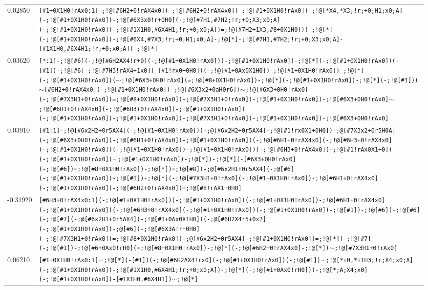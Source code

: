 \begin{longtable}{>{\baselineskip=10pt}p{} >{\baselineskip=10pt}p{}}
0.02850 & \texttt{[\#1+0X1H0!rAx0:1]-;!@[\#6H2+0!rAX4x0](-;!@[\#6H2+0!rAX4x0](-;!@[\#1+0X1H0!rAx0])-;!@[*X4,*X3;!r;+0;H1;x0;A](-;!@[\#1+0X1H0!rAx0])-;!@[\#6X3x0!r+0H0](-;!@[\#7H1,\#7H2;!r;+0;X3;x0;A](-;!@[\#1+0X1H0!rAx0])-;!@[\#1X1H0,\#6X4H1;!r;+0;x0;A])=;!@[\#7H2+1X3,\#8+0X1H0])(-;!@[*](-;!@[\#1+0X1H0!rAx0])-;!@[\#6X4,\#7X3;!r;+0;H1;x0;A]-;!@[*]-;!@[\#7H1,\#7H2;!r;+0;X3;x0;A]-[\#1X1H0,\#6X4H1;!r;+0;x0;A])-;!@[*]} \\ 
0.03620 & \texttt{[*:1]-;!@[\#6](-;!@[\#6H2AX4!r+0](-;!@[\#1+0X1H0!rAx0])(-;!@[\#1+0X1H0!rAx0])-;!@[*](-;!@[\#1+0X1H0!rAx0])(-[\#1])-;!@[\#6]-;!@[\#7H3!rAX4+1x0](-[\#1!rx0+0H0])(-;!@[\#1+0Ax0X1H0])-;!@[\#1+0X1H0!rAx0])-;!@[*](-;!@[\#1+0X1H0!rAx0])($\sim$;!@[\#6X3+0H0!rAx0](=;!@[\#8+0X1H0!rAx0])-;!@[*](-;!@[\#1+0X1H0!rAx0])-;!@[*](-;!@[\#1])($\sim$[\#6H2+0!rAX4x0](-;!@[\#1+0X1H0!rAx0])-;!@[\#6X3x2+0aH0r6])$\sim$;!@[\#6X3+0H0!rAx0](-;!@[\#7X3H1+0!rAx0])=;!@[\#8+0X1H0!rAx0])-;!@[\#7X3H1+0!rAx0](-;!@[\#1+0X1H0!rAx0])-;!@[\#6X3+0H0!rAx0]$\sim$;!@[\#6H1+0!rAX4x0](-;!@[\#6H3+0!rAX4x0](-;!@[\#1+0X1H0!rAx0])(-;!@[\#1+0X1H0!rAx0])-;!@[\#1+0X1H0!rAx0])-;!@[\#7X3H1+0!rAx0](-;!@[\#1+0X1H0!rAx0])-;!@[\#6X3+0H0!rAx0]} \\ 
0.03910 & \texttt{[\#1:1]-;!@[\#6x2H2+0r5AX4](-;!@[\#1+0X1H0!rAx0])(-;@[\#6x2H2+0r5AX4]-;!@[\#1!rx0X1+0H0])-;@[\#7X3x2+0r5H0A](-;!@[\#6X3+0H0!rAx0](-;!@[\#6H1+0!rAX4x0](-;!@[\#1+0X1H0!rAx0])(-;!@[\#6H1+0!rAX4x0](-;!@[\#6H3+0!rAX4x0](-;!@[\#1+0X1H0!rAx0])(-;!@[\#1+0X1H0!rAx0])-;!@[\#1+0X1H0!rAx0])(-;!@[\#6H3+0!rAX4x0](-;!@[\#1!rAx0X1+0])(-;!@[\#1+0X1H0!rAx0])$\sim$;!@[\#1+0X1H0!rAx0])-;!@[*])-;!@[*](-[\#6X3+0H0!rAx0](-;!@[\#6])=;!@[\#8+0X1H0!rAx0])-;!@[*])=;!@[\#8])-;@[\#6x2H1+0r5AX4](-;@[\#6](-;!@[\#1+0X1H0!rAx0])-;!@[\#1])-;!@[*](-;!@[\#7X3H1+0!rAx0](-;!@[\#1+0X1H0!rAx0])-;!@[\#6H1+0!rAX4x0](-;!@[\#1+0X1H0!rAx0])-;!@[\#6H2+0!rAX4x0])=;!@[\#8!rAX1+0H0]} \\ 
-0.31920 & \texttt{[\#6H3+0!rAX4x0:1](-;!@[\#1+0X1H0!rAx0])(-;!@[\#1+0X1H0!rAx0])(-;!@[\#1+0X1H0!rAx0])-;!@[\#6H1+0!rAX4x0](-;!@[\#1+0X1H0!rAx0])(-;!@[\#6H3+0!rAX4x0](-;!@[\#1+0X1H0!rAx0])(-;!@[\#1+0X1H0!rAx0])-;!@[\#1])-;!@[\#6](-;!@[\#6](-;!@[\#7](-;@[\#6x2H1+0r5AX4](-;!@[\#1+0Ax0X1H0])(-;@[\#6H2X4r5+0x2](-;!@[\#1+0X1H0!rAx0])-;@[\#6])-;!@[\#6X3A!r+0H0](-;!@[\#7X3H1+0!rAx0])=;!@[\#8+0X1H0!rAx0])-;@[\#6x2H2+0r5AX4]-;!@[\#1+0X1H0!rAx0])=;!@[*])-;!@[\#7](-;!@[\#1])-;!@[\#6+0Ax0!rH0](=;!@[\#8+0X1H0!rAx0])-;!@[*](-;!@[\#6H2+0!rAX4x0]-;!@[*])$\sim$;!@[\#7X3H1+0!rAx0]} \\ 
0.06210 & \texttt{[\#1+0X1H0!rAx0:1]$\sim$;!@[*](-[\#1])(-;!@[\#6H2AX4!rx0](-;!@[\#1+0X1H0!rAx0])(-;!@[\#1])$\sim$;!@[*+0,*+1H3;!r;X4;x0;A](-;!@[\#1+0X1H0!rAx0])-;!@[\#1X1H0,\#6X4H1;!r;+0;x0;A])-;!@[*](-;!@[\#1+0Ax0!rH0])(-;!@[*;A;X4;x0](-;!@[\#1+0X1H0!rAx0])-[\#1X1H0,\#6X4H1])$\sim$;!@[*]} \\ 

\end{longtable}
